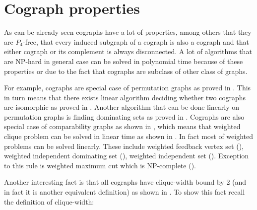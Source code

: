 
\section{Cograph properties}

As can be already seen cographs have a lot of properties, among others that they are $P_4$-free, that every induced subgraph of a cograph is also a cograph and that either cograph or its complement is always disconnected. A lot of algorithms that are NP-hard in general case can be solved in polynomial time because of these properties or due to the fact that cographs are subclass of other class of graphs.

For example, cographs are special case of permutation graphs as proved in \cite{bose}. This in turn means that there exists linear algorithm deciding whether two cographs are isomorphic as proved in \cite{colbourn}. Another algorithm that can be done linearly on permutation graphs is finding dominating sets as proved in \cite{chao}. Cographs are also special case of comparability graphs as shown in \cite{jung}, which means that weighted clique problem can be solved in linear time as shown in \cite{golumbic}. In fact most of weighted problems can be solved linearly. These include weighted feedback vertex set (\cite{coudert}), weighted independent dominating set (\cite{coudert}),  weighted independent set (\cite{bodlaender2}). Exception to this rule is weighted maximum cut which is NP-complete (\cite{kaminski}).

Another interesting fact is that all cographs have clique-width bound by 2 (and in fact it is another equivalent definition) as shown in \cite{courcelle}. To show this fact recall the definition of clique-width:

